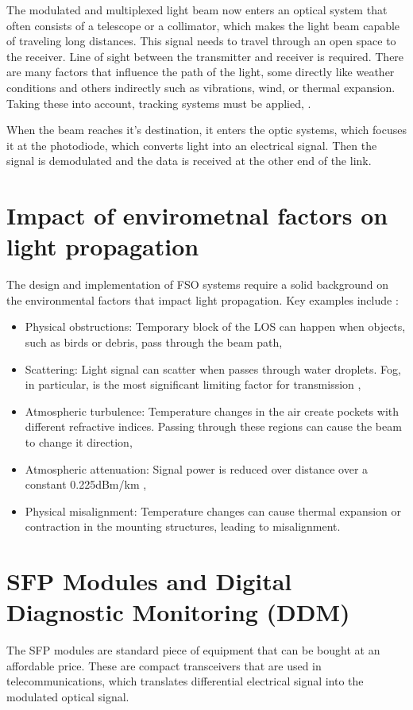 \documentclass[master,oneside,en,oldtitlepage]{dyplompwr}
\begin{document}
The modulated and multiplexed light beam now enters an optical system that often consists of a telescope or a collimator, which makes the light beam capable of traveling long distances.
This signal needs to travel through an open space to the receiver.
Line of sight between the transmitter and receiver is required.
There are many factors that influence the path of the light, some directly like weather conditions and others indirectly such as vibrations, wind, or thermal expansion.
Taking these into account, tracking systems must be applied\cite{bloom2002physics}, \cite{khalighi2014survey}.

When the beam reaches it's destination, it enters the optic systems, which focuses it at the photodiode, which converts light into an electrical signal.
Then the signal is demodulated and the data is received at the other end of the link.

\section{Impact of envirometnal factors on light propagation}
The design and implementation of FSO systems require a solid background on the environmental factors that impact light propagation. Key examples include \cite{malik2015free}:
\begin{itemize}
  \item Physical obstructions: Temporary block of the \ac{LOS} can happen when objects, such as birds or debris, pass through the beam path,
  \item Scattering: Light signal can scatter when passes through water droplets. Fog, in particular, is the most significant limiting factor for transmission \cite{khandakar2018experimental},
  \item Atmospheric turbulence: Temperature changes in the air create pockets with different refractive indices. Passing through these regions can cause the beam to change it direction,
  \item Atmospheric attenuation: Signal power is reduced over distance over a constant 0.225dBm/km \cite{abd2013effect},
  \item Physical misalignment: Temperature changes can cause thermal expansion or contraction in the mounting structures, leading to misalignment.
\end{itemize}
\section{SFP Modules and Digital Diagnostic Monitoring (DDM)}
The \ac{SFP} modules are standard piece of equipment that can be bought at an affordable price. 
These are compact transceivers that are used in telecommunications, which translates differential electrical signal into the modulated optical signal.
\end{document}
